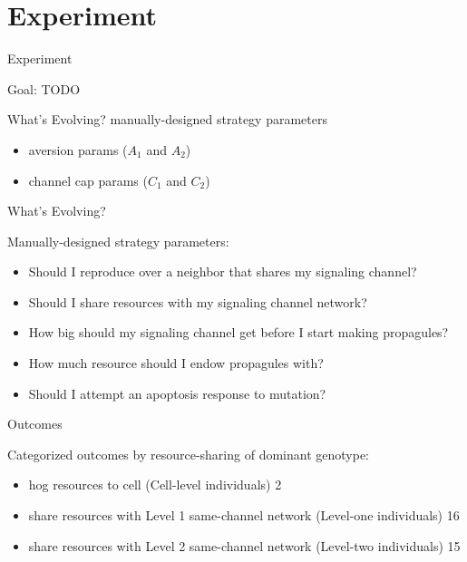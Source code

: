 \section{Experiment}

\begin{frame}{Experiment}

Goal: TODO

\end{frame}

\begin{frame}{What's Evolving?}
manually-designed strategy parameters
\begin{itemize}
\item aversion params ($A_1$ and $A_2$)
\item channel cap params ($C_1$ and $C_2$)

\end{itemize}


\end{frame}

\begin{frame}{What's Evolving?}

Manually-designed strategy parameters:
\begin{itemize}
\item Should I reproduce over a neighbor that shares my signaling channel?
\item Should I share resources with my signaling channel network?
\item How big should my signaling channel get before I start making propagules?
\item How much resource should I endow propagules with?
\item Should I attempt an apoptosis response to mutation?
\end{itemize}
\end{frame}

\begin{frame}{Outcomes}

Categorized outcomes by resource-sharing of dominant genotype:
\begin{itemize}
\item hog resources to cell (Cell-level individuals) 2
\item share resources with Level 1 same-channel network (Level-one individuals) 16
\item share resources with Level 2 same-channel network (Level-two individuals) 15
\end{itemize}

\end{frame}

